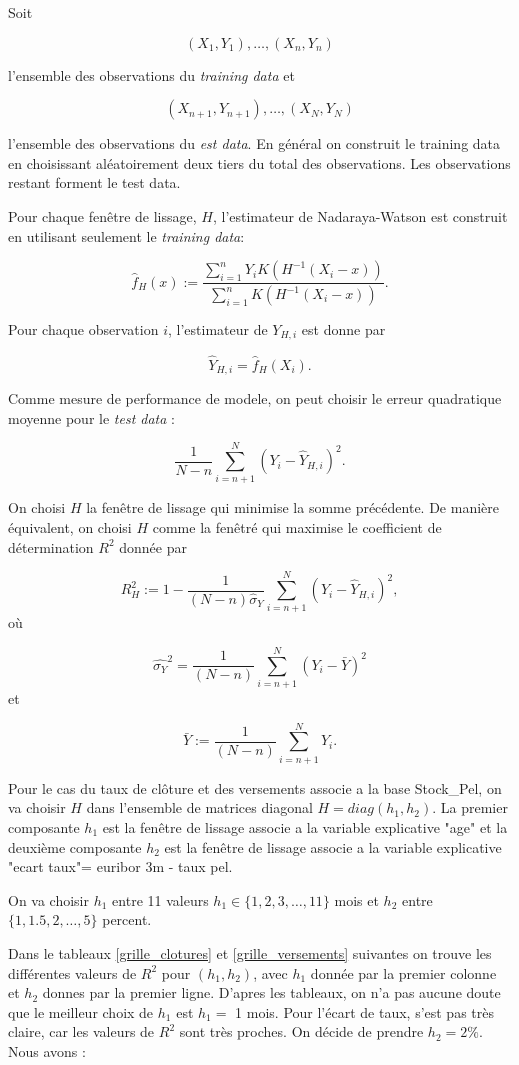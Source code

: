 \documentclass[12pt, a4paper]{book}
\begin{document}
Soit 

$$ (X_1,Y_1),\ldots, (X_n,Y_n)$$

l'ensemble des observations du {\it training data} et

$$ (X_{n+1},Y_{n+1}),\ldots, (X_N,Y_N)$$

l'ensemble des observations du {\it est data}. En général on construit le training data en choisissant aléatoirement deux tiers du total des observations. Les observations restant forment le test data. 

Pour chaque fenêtre de lissage, $H$, l'estimateur  de Nadaraya-Watson est construit en utilisant seulement le {\it training data}:

$$ \hat{f}_H(x) := \frac{\sum_{i=1}^n Y_i K(H^{-1}(X_i-x))}{\sum_{i=1}^n K(H^{-1}(X_i-x))}.$$

Pour chaque observation $i$, l'estimateur de $Y_{H,i}$ est donne par

$$\hat{Y}_{H,i} = \hat{f}_H(X_i).$$

Comme mesure de performance de modele, on peut choisir le erreur quadratique moyenne pour le {\it test data} :

$$ \frac{1}{N-n}\sum_{i=n+1}^N (Y_i-\hat{Y}_{H,i})^2.$$

On choisi $H$ la fenêtre de lissage qui minimise la somme précédente. De manière équivalent, on choisi $H$ comme la fenêtré qui maximise le coefficient de détermination $R^2$ donnée par

$$ R_H^2 :=  1-\frac{1}{(N-n)\hat{\sigma}_Y}\sum_{i=n+1}^N (Y_i-\hat{Y}_{H,i})^2,$$
où 

$$ \hat{\sigma_Y}^2 = \frac{1}{(N-n)} \sum_{i=n+1}^N (Y_i-\bar{Y})^2$$
et 

$$\bar{Y}:= \frac{1}{(N-n)}\sum_{i=n+1}^N Y_i.$$

\bigskip

Pour le cas du taux de clôture et des versements associe a la base Stock\_Pel, on va choisir $H$ dans l'ensemble de matrices diagonal $H=diag(h_1,h_2)$. La premier composante $h_1$ est la fenêtre de lissage associe a la variable explicative "age" et la deuxième composante $h_2$ est la fenêtre de lissage associe a la variable explicative "ecart taux"= euribor 3m - taux pel. 

On va choisir $h_1$ entre 11 valeurs $h_1 \in \{ 1, 2, 3, \ldots, 11\}$ mois et $h_2$ entre $\{1, 1.5, 2, \ldots, 5\}$ percent.  

Dans le tableaux \ref{grille_clotures} et \ref{grille_versements} suivantes on trouve les différentes valeurs de $R^2$ pour $(h_1,h_2)$, avec $h_1$ donnée par la premier colonne et $h_2$ donnes par la premier ligne.   D'apres les tableaux, on n'a pas aucune doute que le meilleur choix de $h_1$  est $h_1=$ 1 mois. Pour l'écart de taux, s'est pas très claire, car les valeurs de $R^2$ sont très proches. On décide de prendre $h_2 = 2\%$. Nous avons : 
\end{document}
